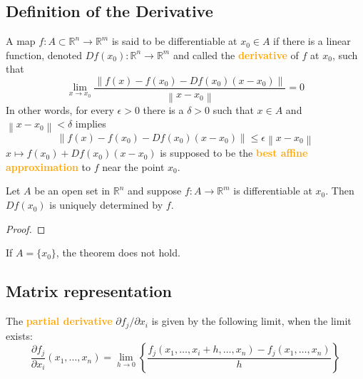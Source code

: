 \subsection{Definition of the Derivative}
\begin{definition}
A map $f:A\subset \mathbb{R}^n\to \mathbb{R}^m$ is said to be differentiable at $x_0\in A$ if there is a linear function, denoted $Df(x_0):\mathbb{R}^n\to \mathbb{R}^m$ and called the \textbf{\textcolor{orange}{derivative}} of $f$ at $x_0$, such that
$$\lim_{x\to x_0}\frac{\left\|f(x)-f(x_0)-Df(x_0)(x-x_0)\right\|}{\left\|x-x_0\right\|}=0$$
In other words, for every $\epsilon>0$ there is a $\delta >0$ such that $x\in A$ and $\left\|x-x_0\right\|<\delta$ implies
$$\left\|f(x)-f(x_0)-Df(x_0)(x-x_0)\right\|\leq \epsilon \left\|x-x_0\right\|$$
$x\mapsto f(x_0)+Df(x_0)(x-x_0)$ is supposed to be the \textbf{\textcolor{orange}{best affine approximation}} to $f$ near the point $x_0$.
\end{definition}

\begin{theorem}
Let $A$ be an open set in $\mathbb{R}^n$ and suppose $f:A\to \mathbb{R}^m$ is differentiable at $x_0$. Then $Df(x_0)$ is uniquely determined by $f$.
\end{theorem}
\begin{proof}

\end{proof}

\begin{example}
If $A=\{x_0\}$, the theorem does not hold.
\end{example}

\subsection{Matrix representation}

\begin{definition}
The \textbf{\textcolor{orange}{partial derivative}} ${\partial f_j}/{\partial x_i}$ is given by the following limit, when the limit exists:
$$\frac{\partial f_j}{\partial x_i}(x_1,\dots,x_n)=\lim_{h\to 0} \left\{\frac{f_j(x_1,\dots,x_i+h,\dots,x_n)-f_j(x_1,\dots,x_n)}{h}\right\}$$
\end{definition}

